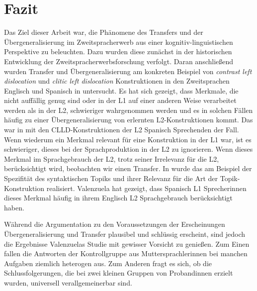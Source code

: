 \section{Fazit}

\begin{comment}
    * Einleitung und Fazit müssen zusammenpassen.
    * sind die Erkenntnisse im Fazit aus der Arbeit ableitbar?
    * Vorgehensweise zusammenfassen

Kritische Zusammenfassung
\begin{itemize}
    \item was war in den Texten nicht so gelungen?
    \item welche Fragen sind offen geblieben?
    \item in welche Richtung kann noch weiter geforscht werden?
    \item was sind gegnerische Meinungen zum Thema?
\end{itemize}
\end{comment}


Das Ziel dieser Arbeit war, die Phänomene des Transfers und der Übergeneralisierung im Zweitspracherwerb aus einer kognitiv-linguistischen Perspektive zu beleuchten.
Dazu wurden diese zunächst in der historischen Entwicklung der Zweitspracherwerbsforschung verfolgt.
Daran anschließend wurden Transfer und Übergeneralisierung am konkreten Beispiel von \textit{contrast left dislocation} und \textit{clitic left dislocation} Konstruktionen in den Zweitsprachen Englisch und Spanisch in \cite[][]{Valenzuela05} untersucht.
Es hat sich gezeigt, dass Merkmale, die nicht auffällig genug sind oder in der L1 auf einer anderen Weise verarbeitet werden als in der L2, schwieriger wahrgenommen werden
und es in solchen Fällen häufig zu einer Übergeneralisierung von erlernten L2-Konstruktionen kommt.
Das war in \cite[][]{Valenzuela05} mit den CLLD-Konstruktionen der L2 Spanisch Sprechenden der Fall.
Wenn wiederum ein Merkmal relevant für eine Konstruktion in der L1 war, ist es schwieriger, dieses bei der Sprachproduktion in der L2 zu ignorieren.
Wenn dieses Merkmal im Sprachgebrauch der L2, trotz seiner Irrelevanz für die L2, berücksichtigt wird, beobachten wir einen Transfer.
In \cite[][]{Valenzuela05} wurde das am Beispiel der Spezifität des syntaktischen Topiks und ihrer Relevanz für die Art der Topik-Konstruktion realisiert.
Valenzuela hat gezeigt, dass Spanisch L1 Sprecherinnen dieses Merkmal häufig in ihrem Englisch L2 Sprachgebrauch berücksichtigt haben.

Während die Argumentation zu den Voraussetzungen der Erscheinungen Übergeneralisierung und Transfer plausibel und schlüssig erscheint, sind jedoch die Ergebnisse Valenzuelas Studie \cite[][]{Valenzuela05} mit gewisser Vorsicht zu genießen.
Zum Einen fallen die Antworten der Kontrollgruppe aus Muttersprachlerinnen bei manchen Aufgaben ziemlich heterogen aus.
Zum Anderen fragt es sich, ob die Schlussfolgerungen, die bei zwei kleinen Gruppen von Probandinnen erzielt wurden, universell verallgemeinerbar sind.

